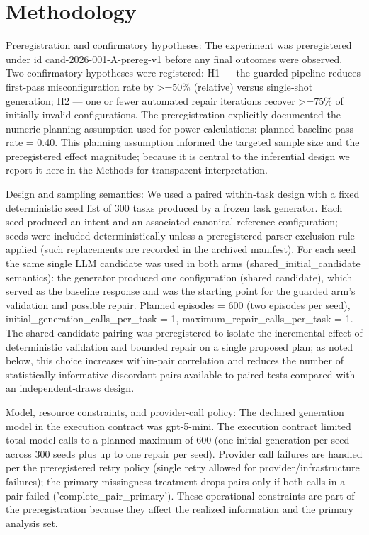 \documentclass[conference]{IEEEtran}
\begin{document}
\section{Methodology}
Preregistration and confirmatory hypotheses: The experiment was preregistered under id cand-2026-001-A-prereg-v1 before any final outcomes were observed. Two confirmatory hypotheses were registered: H1 --- the guarded pipeline reduces first‑pass misconfiguration rate by >=50\% (relative) versus single‑shot generation; H2 --- one or fewer automated repair iterations recover >=75\% of initially invalid configurations. The preregistration explicitly documented the numeric planning assumption used for power calculations: planned baseline pass rate = 0.40. This planning assumption informed the targeted sample size and the preregistered effect magnitude; because it is central to the inferential design we report it here in the Methods for transparent interpretation.

Design and sampling semantics: We used a paired within‑task design with a fixed deterministic seed list of 300 tasks produced by a frozen task generator. Each seed produced an intent and an associated canonical reference configuration; seeds were included deterministically unless a preregistered parser exclusion rule applied (such replacements are recorded in the archived manifest). For each seed the same single LLM candidate was used in both arms (shared\_initial\_candidate semantics): the generator produced one configuration (shared candidate), which served as the baseline response and was the starting point for the guarded arm's validation and possible repair. Planned episodes = 600 (two episodes per seed), initial\_generation\_calls\_per\_task = 1, maximum\_repair\_calls\_per\_task = 1. The shared‑candidate pairing was preregistered to isolate the incremental effect of deterministic validation and bounded repair on a single proposed plan; as noted below, this choice increases within‑pair correlation and reduces the number of statistically informative discordant pairs available to paired tests compared with an independent‑draws design.

Model, resource constraints, and provider‑call policy: The declared generation model in the execution contract was gpt-5-mini. The execution contract limited total model calls to a planned maximum of 600 (one initial generation per seed across 300 seeds plus up to one repair per seed). Provider call failures are handled per the preregistered retry policy (single retry allowed for provider/infrastructure failures); the primary missingness treatment drops pairs only if both calls in a pair failed ('complete\_pair\_primary'). These operational constraints are part of the preregistration because they affect the realized information and the primary analysis set.
\end{document}
